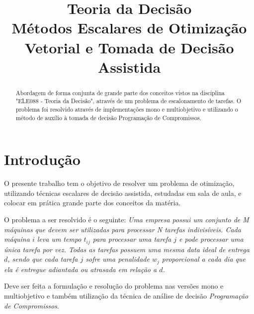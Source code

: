 \documentclass[conference]{IEEEtran}
\begin{document}
\title{Teoria da Decisão\\ Métodos Escalares de Otimização Vetorial e Tomada de Decisão Assistida}


\author{
\and
{}
}

\maketitle

\begin{abstract}
Abordagem de forma conjunta de grande parte dos conceitos vistos na disciplina "ELE088 - Teoria da Decisão", através de um problema de escalonamento de tarefas. O problema foi resolvido através de implementações mono e multiobjetivo e utilizando o método de auxílio à tomada de decisão Programação de Compromissos.
\end{abstract}

\IEEEpeerreviewmaketitle

\section{Introdução}
O presente trabalho tem o objetivo de resolver um problema de otimização, utilizando técnicas escalares de decisão assistida, estudadas em sala de aula, e colocar em prática grande parte dos conceitos da matéria.

O problema a ser resolvido é o seguinte:
\textit{Uma empresa possui um conjunto de M máquinas que devem ser utilizadas para processar N tarefas indivisíveis. Cada máquina $i$ leva um tempo $t_{ij}$ para processar uma tarefa $j$ e pode processar uma única tarefa por vez. Todas as tarefas possuem uma mesma data ideal de entrega $d$, sendo que cada tarefa $j$ sofre uma penalidade $w_j$ proporcional a cada dia que ela é entregue adiantada ou atrasada em relação a $d$.}

Deve ser feita a formulação e resolução do problema nas versões mono e multiobjetivo e também utilização da técnica de análise de decisão \emph{Programação de Compromissos}.
\end{document}
